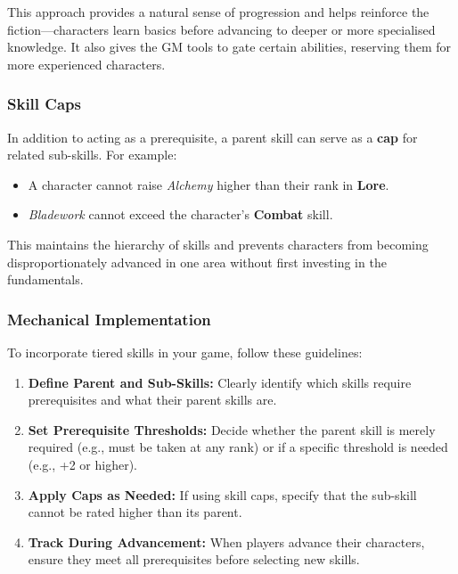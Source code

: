 This approach provides a natural sense of progression and helps reinforce the fiction—characters learn basics before advancing to deeper or more specialised knowledge. It also gives the GM tools to gate certain abilities, reserving them for more experienced characters.


\subsubsection*{Skill Caps}

In addition to acting as a prerequisite, a parent skill can serve as a \textbf{cap} for related sub-skills. For example:

\begin{itemize}
    \item A character cannot raise \textit{Alchemy} higher than their rank in \textbf{Lore}.
    \item \textit{Bladework} cannot exceed the character’s \textbf{Combat} skill.
\end{itemize}

This maintains the hierarchy of skills and prevents characters from becoming disproportionately advanced in one area without first investing in the fundamentals.

\subsubsection*{Mechanical Implementation}

To incorporate tiered skills in your game, follow these guidelines:

\begin{enumerate}
    \item \textbf{Define Parent and Sub-Skills:} Clearly identify which skills require prerequisites and what their parent skills are.
    \item \textbf{Set Prerequisite Thresholds:} Decide whether the parent skill is merely required (e.g., must be taken at any rank) or if a specific threshold is needed (e.g., +2 or higher).
    \item \textbf{Apply Caps as Needed:} If using skill caps, specify that the sub-skill cannot be rated higher than its parent.
    \item \textbf{Track During Advancement:} When players advance their characters, ensure they meet all prerequisites before selecting new skills.
\end{enumerate}



